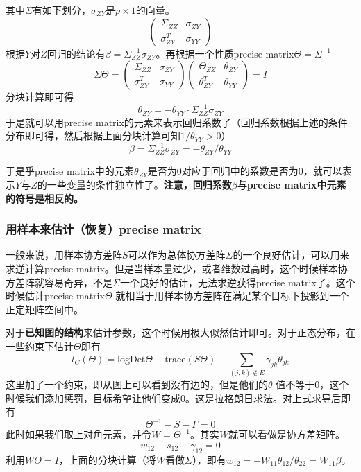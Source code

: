 ﻿\documentclass[hyperref,12pt]{ctexart}
\begin{document}
其中$\Sigma$有如下划分，$\sigma_{ZY}$是$p \times 1$的向量。
\[
\begin{pmatrix}
\Sigma_{ZZ} & \sigma_{ZY} \\
\sigma_{ZY}^T & \sigma_{YY}
\end{pmatrix}
\]
根据$Y$对$Z$回归的结论有$\beta = \Sigma_{ZZ}^{-1}\sigma_{ZY}$。再根据一个性质precise matrix$\Theta = \Sigma^{-1}$
\[
\Sigma \Theta =
\begin{pmatrix}
\Sigma_{ZZ} & \sigma_{ZY} \\
\sigma_{ZY}^T & \sigma_{YY}
\end{pmatrix}
\begin{pmatrix}
\Theta_{ZZ} & \theta_{ZY} \\
\theta_{ZY}^T & \theta_{YY}
\end{pmatrix}
=I
\]
分块计算即可得
\[
\theta_{ZY} = -\theta_{YY}\cdot \Sigma_{ZZ}^{-1}\sigma_{ZY}
\]
于是就可以用precise matrix的元素来表示回归系数了（回归系数根据上述的条件分布即可得，然后根据上面分块计算可知$1/\theta_{YY} > 0$）
\[
\beta = \Sigma_{ZZ}^{-1}\sigma_{ZY} = - \theta_{ZY}/\theta_{YY}
\]

于是乎precise matrix中的元素$\theta_{ZY}$是否为0对应于回归中的系数是否为0，就可以表示$Y$与$Z$的一些变量的条件独立性了。\textbf{注意，回归系数$\beta$与precise matrix中元素的符号是相反的。}


\subsubsection{用样本来估计（恢复）precise matrix}
一般来说，用样本协方差阵$S$可以作为总体协方差阵$\Sigma$的一个良好估计，可以用来求逆计算precise matrix。但是当样本量过少，或者维数过高时，这个时候样本协方差阵就容易奇异，不是$\Sigma$一个良好的估计，无法求逆获得precise matrix了。这个时候估计precise matrix$\Theta$ 就相当于用样本协方差阵在满足某个目标下投影到一个正定矩阵空间中。

对于\textbf{已知图的结构}来估计参数，这个时候用极大似然估计即可。对于正态分布，在一些约束下估计$\Theta$即有
\[
l_C(\Theta) = \text{logDet}\Theta - \text{trace}(S\Theta) - \sum_{(j, k) \notin E} \gamma_{jk}\theta_{jk}
\]
这里加了一个约束，即从图上可以看到没有边的，但是他们的$\theta$ 值不等于0，这个时候我们添加惩罚，目标希望让他们变成0。这是拉格朗日求法。对上式求导后即有
\[
\Theta^{-1} - S - \Gamma = 0
\]
此时如果我们取上对角元素，并令$W = \Theta^{-1}$。其实$W$就可以看做是协方差矩阵。
\[
w_{12} - s_{12} - \gamma_{12} = 0
\]
利用$W\Theta = I$，上面的分块计算（将$W$看做$\Sigma$），即有$w_{12} = -W_{11}\theta_{12}/\theta_{22} = W_{11}\beta$。
\end{document}
